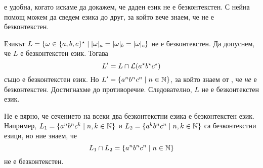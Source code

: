  е удобна, когато искаме да докажем, че даден език не е безконтекстен.
С нейна помощ можем да сведем езика до друг, за който вече знаем, че не е безконтекстен.

\begin{example}
  Езикът $L = \{\omega \in \{a,b,c\}^\star \mid \vert{\omega}\vert_{a} = \vert{\omega}\vert_{b} = \vert{\omega}\vert_{c}\}$ не е безконтекстен.
  Да допуснем, че $L$ е безконтекстен език.
  Тогава \[L^\prime = L \cap \mathcal{L}(a^\star b^\star c^\star)\] също е безконтекстен език.
  Но $L^\prime = \{a^nb^nc^n \mid n \in \mathbb{N}\}$, за който знаем от , че {\em не} е безконтекстен.
  Достигнахме до противоречие. Следователно, $L$ не е безконтекстен език.
\end{example}

\begin{important}
  \begin{remark}
    Не е вярно, че сечението на всеки два безконтекстни езика е безконтекстен език.
    Например, $L_1 = \{a^nb^nc^k \mid n,k\in\mathbb{N}\}$ и $L_2 = \{a^kb^nc^n \mid n,k\in\mathbb{N}\}$
    са безконтекстни езици, но ние знаем, че
    \[L_1 \cap L_2 = \{a^nb^nc^n \mid n \in \mathbb{N}\}\]
    не е безконтекстен.
  \end{remark}
\end{important}


